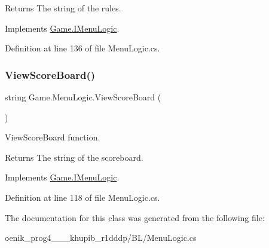 \begin{DoxyReturn}{Returns}
The string of the rules.
\end{DoxyReturn}


Implements \mbox{\hyperlink{interface_game_1_1_i_menu_logic_a4d6129e2d747d4d6047e9d26d8996ac2}{Game.\+I\+Menu\+Logic}}.



Definition at line 136 of file Menu\+Logic.\+cs.

\mbox{\label{class_game_1_1_menu_logic_a1dd2dae3ed7ea7bb1c156cb5e480cb02}} 
\subsubsection{\texorpdfstring{ViewScoreBoard()}{ViewScoreBoard()}}
{\footnotesize\ttfamily string Game.\+Menu\+Logic.\+View\+Score\+Board (\begin{DoxyParamCaption}{ }\end{DoxyParamCaption})}



View\+Score\+Board function. 

\begin{DoxyReturn}{Returns}
The string of the scoreboard.
\end{DoxyReturn}


Implements \mbox{\hyperlink{interface_game_1_1_i_menu_logic_a4abce1542884de119ff7f241979106ee}{Game.\+I\+Menu\+Logic}}.



Definition at line 118 of file Menu\+Logic.\+cs.



The documentation for this class was generated from the following file\+:\begin{DoxyCompactItemize}
\item 
oenik\+\_\+prog4\+\_\+\_\+\_\+khupib\+\_\+r1dddp/\+B\+L/Menu\+Logic.\+cs\end{DoxyCompactItemize}

